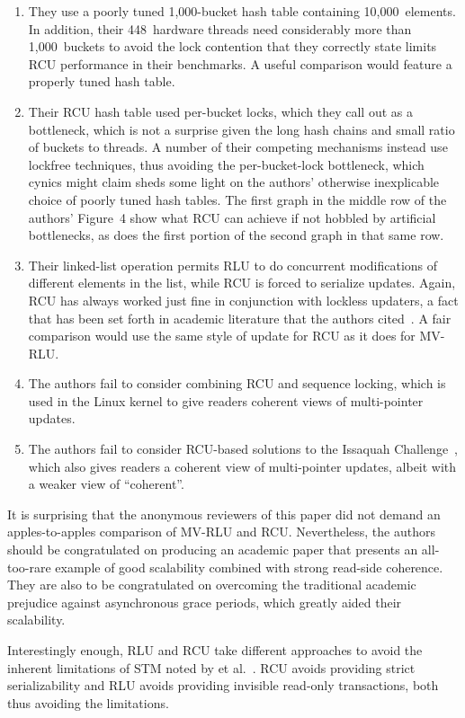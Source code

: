{\begin{enumerate}
	\fi

	\item	They use a poorly tuned 1,000-bucket hash table containing
		10,000~elements.
		In addition, their 448~hardware threads need considerably
		more than 1,000~buckets to avoid the lock contention
		that they correctly state limits RCU performance in
		their benchmarks.
		A useful comparison would feature a properly tuned
		hash table.
	\item	Their RCU hash table used per-bucket locks, which they
		call out as a bottleneck, which is not a surprise given
		the long hash chains and small ratio of buckets to threads.
		A number of their competing mechanisms instead use
		lockfree techniques, thus avoiding the per-bucket-lock
		bottleneck, which cynics might claim sheds some light
		on the authors' otherwise inexplicable choice of poorly
		tuned hash tables.
		The first graph in the middle row of the authors'
		Figure~4 show what RCU can achieve if not hobbled by
		artificial bottlenecks, as does the first portion of
		the second graph in that same row.
	\item	Their linked-list operation permits RLU to do concurrent
		modifications of different elements in the list, while
		RCU is forced to serialize updates.
		Again, RCU has always worked just fine in conjunction
		with lockless updaters, a fact that has been set forth
		in academic literature that the authors
		cited~\cite{MathieuDesnoyers2012URCU}.
		A fair comparison would use the same style of update
		for RCU as it does for MV-RLU.
	\item	The authors fail to consider combining RCU and sequence
		locking, which is used in the Linux kernel to give
		readers coherent views of multi-pointer updates.
	\item	The authors fail to consider RCU-based solutions to the
		Issaquah Challenge~\cite{PaulEMcKenney2016IssaquahCPPCON},
		which also gives readers a coherent view of multi-pointer
		updates, albeit with a weaker view of ``coherent''.
	\end{enumerate}

	It is surprising that the anonymous reviewers of this paper did
	not demand an apples-to-apples comparison of MV-RLU and RCU\@.
	Nevertheless, the authors should be congratulated on producing
	an academic paper that presents an all-too-rare example of good
	scalability combined with strong read-side coherence.
	They are also to be congratulated on overcoming the traditional
	academic prejudice against asynchronous grace periods,
	which greatly aided their scalability.

	Interestingly enough, RLU and RCU take different approaches to avoid
	the inherent limitations of STM noted by  et
	al.~\cite{Attiya:2009:STMReadOnlyLimits}.
	RCU avoids providing strict serializability and RLU avoids providing
	invisible read-only transactions, both thus avoiding the
	limitations.
}\QuickQuizEnd

